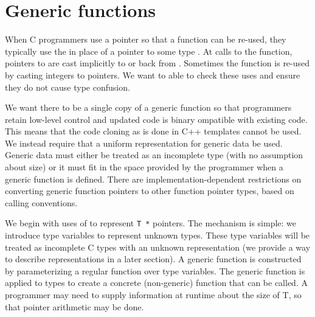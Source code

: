 \section{Generic functions}
\label{sec:generic-functions}

When C programmers use a \uncheckedptrvoid{} pointer so that a function
can be re-used, they typically use the \uncheckedptrvoid{} in place of a pointer 
to some type .  At calls to the function, pointers to  are cast
implicitly to \uncheckedptrvoid{} or back from \uncheckedptrvoid{}.  
Sometimes the function is re-used by casting integers to \uncheckedptrvoid{} pointers.
We want to able to check these uses and ensure they do not cause type confusion.

We want there to be a single copy of a generic function so that programmers
retain low-level control and updated code is binary ompatible with existing code.  
This means that the code cloning as is done in C++ templates cannot be used.  
We instead require that a uniform representation for generic data be used.
Generic data must either be treated as an incomplete type (with no assumption
about size) or it must fit in the space provided by the programmer when
a generic function is defined. There are implementation-dependent restrictions 
on converting generic function pointers to  other function pointer types,
based on calling conventions.

We begin with uses of \uncheckedptrvoid{} to represent \lstinline+T *+ pointers.
The mechanism is simple: we introduce type variables to represent unknown types.
These type variables will be treated as incomplete C types with an unknown
representation (we provide a way to describe representations in a later
section).   A generic function is constructed by parameterizing a
regular function over type variables.  The generic function is applied
to types to create a concrete (non-generic) function that can be called.
A programmer may need to supply information at runtime about the size of T,
so that pointer arithmetic may be done.

